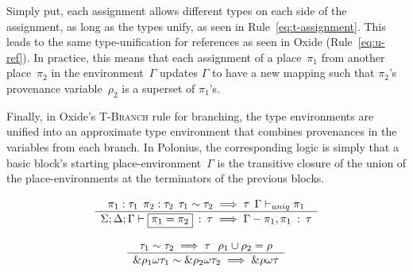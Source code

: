 \documentclass[11pt,a4paper,twoside,openany]{report}
\newcommand{\expression}[1]{\boxed{#1}}
\newcommand{\ntyperule}[2]{\begin{array}{c}#1\\\hline\raisebox{1pt}{\strut}#2\end{array}}
\begin{document}
Simply put, each assignment allows different types on each side of the
assignment, as long as the types unify, as seen in Rule~\eqref{eq:t-assignment}.
This leads to the same type-unification for references as seen in Oxide
(Rule~\eqref{eq:u-ref}). In practice, this means that each assignment of a
place~$\pi_1$ from another place~$\pi_2$ in the environment~$\Gamma$ updates
$\Gamma$ to have a new mapping such that $\pi_2$'s provenance variable~$\rho_2$
is a superset of $\pi_1$'s.

Finally, in Oxide's \textsc{T-Branch} rule for branching, the type environments
are unified into an approximate type environment that combines provenances in
the variables from each branch. In Polonius, the corresponding logic is simply
that a basic block's starting place-environment~$\Gamma$ is the transitive
closure of the union of the place-environments at the terminators of the
previous blocks.

\begin{equation}\label{eq:t-assignment}
  \ntyperule{\pi_1 : \tau_1 \:\: \pi_2 : \tau_2 \:\: \tau_1 \sim \tau_2 \implies \tau \:\: \Gamma \vdash_{uniq} \pi_1}
  {\Sigma ; \Delta ; \Gamma \vdash \expression{\pi_1 = \pi_2} \: : \: \tau \implies \Gamma - \pi_1, \pi_1 \: : \: \tau}
\end{equation}

\begin{equation}\label{eq:u-ref}
  \ntyperule{\tau_1 \sim \tau_2 \implies \tau \:\:\: \rho_1 \cup \rho_2 = \rho}
  {\&\rho_1 \omega \tau_1 \sim \& \rho_2  \omega \tau_2 \implies \&\rho \omega \tau}
\end{equation}
\end{document}
